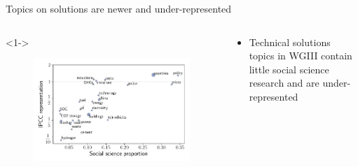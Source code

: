 \documentclass[9pt, aspectratio=169]{beamer}
\begin{document}
\begin{frame}{Topics on solutions are newer and under-represented}

\vspace{-0.5cm}

\begin{columns}
	
	\begin{column}{0.618\linewidth}<1->
		\begin{figure}[h!]
			\begin{center}
				\includegraphics[width=\linewidth]{../plots/run_1861_wg3_socsci_lp.pdf}
			\end{center}
		\end{figure}
		
	\end{column}
	\begin{column}{0.382\linewidth}
		\begin{itemize}
			\item<1-> Technical solutions topics in WGIII contain little social science research and are under-represented
			
			
		\end{itemize}
	\end{column}
\end{columns}
\end{frame}
\end{document}
